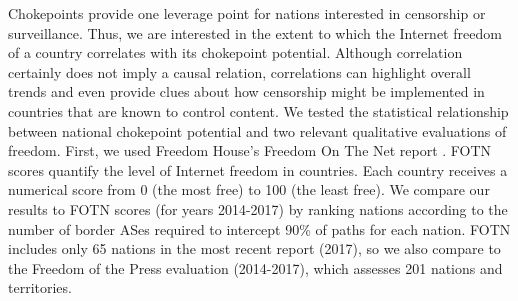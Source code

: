 Chokepoints provide one leverage point for nations interested in censorship or surveillance.
Thus, we are interested in the extent to which the Internet freedom of a country correlates with its chokepoint potential.
Although correlation certainly does not imply a causal relation, correlations can highlight overall trends and even provide clues about how censorship might be implemented in countries that are known to control content.
We tested the statistical relationship between national chokepoint potential
and two relevant qualitative evaluations of freedom. First, we used
Freedom House's Freedom On The Net report \cite{FOTN}. FOTN scores
quantify the level of Internet freedom in countries.  Each country
receives a numerical score from 0 (the most free) to 100 (the least
free). We compare our results to FOTN scores (for years 2014-2017) by ranking nations
according to the number of border ASes required to intercept 90\% of
paths for each nation.  FOTN includes only 65 nations in the most
recent report (2017), so we also compare to the Freedom of
the Press evaluation (2014-2017), which assesses 201 nations and territories.


